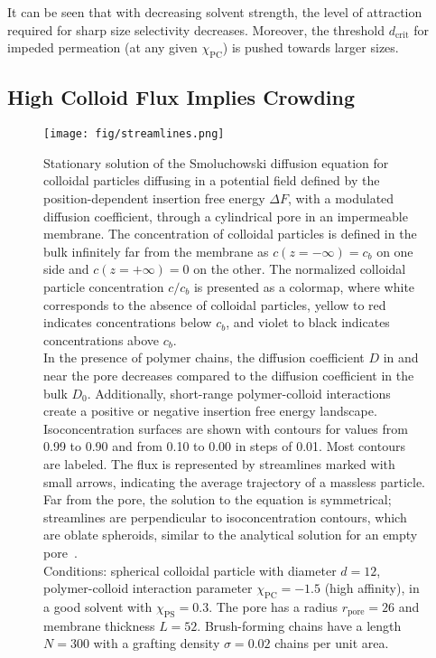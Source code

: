 \documentclass[12pt, a4paper]{article}
\begin{document}
It can be seen that with decreasing solvent strength, the level of attraction required for sharp size selectivity decreases. 
Moreover, the threshold $d_{\text{crit}}$ for impeded permeation (at any given $\chi_{\text{PC}}$) is pushed towards larger sizes.


\subsection{High Colloid Flux Implies Crowding}

\begin{figure}
    \centering
    \texttt{[image: fig/streamlines.png]}
    \caption{
    Stationary solution of the Smoluchowski diffusion equation for colloidal particles diffusing in a potential field defined by the position-dependent insertion free energy $\Delta F$, with a modulated diffusion coefficient, through a cylindrical pore in an impermeable membrane.
    The concentration of colloidal particles is defined in the bulk infinitely far from the membrane as $c(z = -\infty) = c_{b}$ on one side and $c(z = +\infty) = 0$ on the other.
    The normalized colloidal particle concentration $c / c_{b}$ is presented as a colormap, where white corresponds to the absence of colloidal particles, yellow to red indicates concentrations below $c_{b}$, and violet to black indicates concentrations above $c_{b}$.
    \\
    In the presence of polymer chains, the diffusion coefficient $D$ in and near the pore decreases compared to the diffusion coefficient in the bulk $D_0$.
    Additionally, short-range polymer-colloid interactions create a positive or negative insertion free energy landscape.
    \\
    Isoconcentration surfaces are shown with contours for values from 0.99 to 0.90 and from 0.10 to 0.00 in steps of 0.01.
    Most contours are labeled.
    The flux is represented by streamlines marked with small arrows, indicating the average trajectory of a massless particle.
    \\
    Far from the pore, the solution to the equation is symmetrical; streamlines are perpendicular to isoconcentration contours, which are oblate spheroids, similar to the analytical solution for an empty pore~\cite{Brunn1984}.
    \\
    Conditions: spherical colloidal particle with diameter $d = 12$, polymer-colloid interaction parameter $\chi_{\textrm{PC}} = -1.5$ (high affinity), in a good solvent with $\chi_{\textrm{PS}} = 0.3$.
    The pore has a radius $r_{\textrm{pore}} = 26$ and membrane thickness $L = 52$.
    Brush-forming chains have a length $N = 300$ with a grafting density $\sigma = 0.02$ chains per unit area.
    }
    \label{fig:colloid_concentration}
\end{figure}
\end{document}
